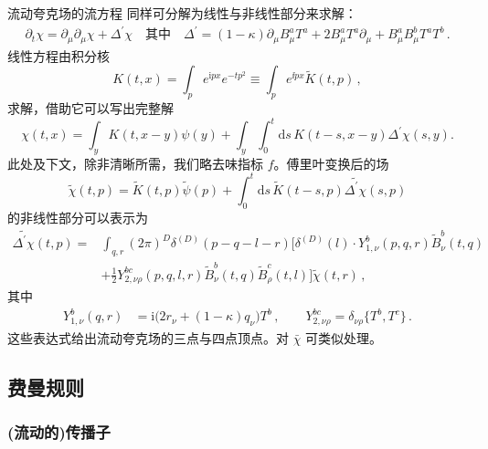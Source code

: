 流动夸克场的流方程  同样可分解为线性与非线性部分来求解：
\begin{align}
  \partial_t \chi =\partial_\mu \partial_\mu \chi + \Delta^\prime \chi
  \quad \text{其中} \quad \Delta^\prime = (1-\kappa) \partial_\mu
  B_\mu^a T^a + 2 B_\mu^a T^a \partial_\mu + B_\mu^a B_\mu^b T^a T^b\,.
\end{align}
线性方程由积分核
\begin{equation}
  K(t,x)=\int_p e^{\mathrm{i}px} e^{-tp^2} \equiv \int_p e^{\ii
    px}\widetilde K(t,p)\,,
  \label{eq:k}
\end{equation}
求解，借助它可以写出完整解
\begin{equation}
  \chi(t,x)= \int_y K(t,x-y)\psi(y) + \int_y \int_0^t \mathrm{d}s \, K(t-s,x-y) \Delta^\prime \chi(s,y).
\end{equation}
此处及下文，除非清晰所需，我们略去味指标 $f$。傅里叶变换后的场
\begin{equation}
  \widetilde{\chi}(t,p)= \widetilde{K}(t,p)\widetilde{\psi}(p) + \int_0^t \mathrm{d}s \, \widetilde{K}(t-s,p)\widetilde{\Delta^\prime \chi}(s,p)
  \label{eq:quark_solution_momentum}
\end{equation}
的非线性部分可以表示为
\begin{equation}
  \begin{split}
    \widetilde{\Delta^\prime \chi}(t,p) =&
    \int_{q,r} (2\pi)^D \delta^{(D)}(p-q-l-r)\bigg[
      \delta^{(D)}(l)\cdot Y_{1,\nu}^{b}(p,q,r)
      \widetilde{B}_{\nu}^{b}(t,q)
      \\&+
    \frac{1}{2}
    Y_{2,\nu\rho}^{bc}(p,q,l,r)
    \widetilde{B}_{\nu}^{b}(t,q)
    \widetilde{B}_{\rho}^{c}(t,l)\bigg] \widetilde{\chi}(t,r)\,,
  \end{split}
\end{equation}
其中
\begin{equation}
  \begin{split}
  Y_{1,\nu}^b(q,r) &= \mathrm{i} \big( 2 r_\nu + (1-\kappa) q_\nu \big)
  T^b\,,\qquad
  Y_{2,\nu\rho}^{bc} = \delta_{\nu\rho} \bigl\{ T^{b}, T^{c} \bigr\}\,.
  \end{split}
\end{equation}
这些表达式给出流动夸克场的三点与四点顶点。对 $\bar{\chi}$ 可类似处理。


\subsection{费曼规则}
\label{ssec:Feynman_rules}


\subsubsection*{(流动的)传播子}

